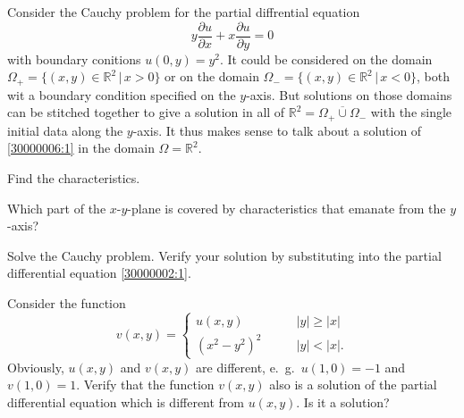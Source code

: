 Consider the Cauchy problem for the partial diffrential equation
\begin{equation}
y\frac{\partial u}{\partial x}+x\frac{\partial u}{\partial y}=0
\label{30000002:1}
\end{equation}
with boundary conitions $u(0,y)=y^2$.
It could be considered on the domain
$\Omega_+=\{ (x,y)\in\mathbb R^2\,|\, x > 0\}$
or on the domain
$\Omega_-=\{(x,y)\in\mathbb R^2\,|\, x <0\}$,
both wit a boundary condition specified on the $y$-axis.
But solutions on those domains can be stitched together to give a solution
in all of $\mathbb R^2=\overline{\Omega_+\cup\Omega_-}$ with the single
initial data along the $y$-axis.
It thus makes sense to talk about a solution of 
\eqref{30000006:1} in the domain $\Omega=\mathbb R^2$.
\begin{teilaufgaben}
\item
Find the characteristics.
\item
Which part of the $x$-$y$-plane is covered by characteristics that emanate
from the $y$-axis?
\item
Solve the Cauchy problem.
Verify your solution by substituting into the partial differential equation
\eqref{30000002:1}.
\item
Consider the function
\[
v(x,y)=\begin{cases}
u(x,y)&\qquad |y|\ge |x|\\
(x^2-y^2)^2&\qquad |y|<|x|.
\end{cases}
\]
Obviously, $u(x,y)$ and $v(x,y)$ are different, e.~g.~$u(1,0)=-1$
and $v(1,0)=1$.
Verify that the function $v(x,y)$ also is a solution of the partial
differential equation which is different from $u(x,y)$.
Is it a solution?
\end{teilaufgaben}


